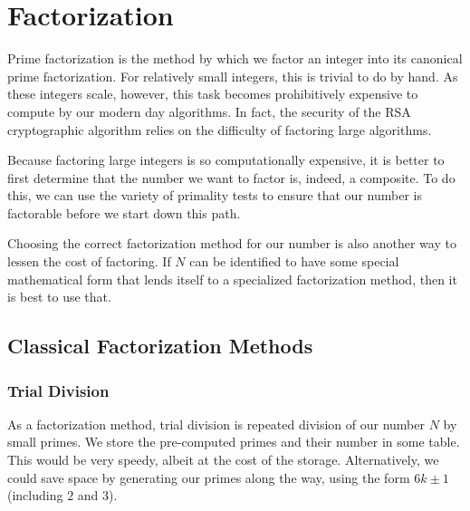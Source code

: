 \documentclass{article}
\begin{document}


\section{Factorization}\label{Factorization}

\par Prime factorization is the method by which we factor an integer into its canonical prime factorization.
For relatively small integers, this is trivial to do by hand. As these integers scale, however, this task
becomes prohibitively expensive to compute by our modern day algorithms. In fact, the security of the RSA
cryptographic algorithm relies on the difficulty of factoring large algorithms.

\par Because factoring large integers is so computationally expensive, it is better to first determine that
the number we want to factor is, indeed, a composite. To do this, we can use the variety of primality tests
to ensure that our number is factorable before we start down this path.

\par Choosing the correct factorization method for our number is also another way to lessen the cost of
factoring. If $N$ can be identified to have some special mathematical form that lends itself to a specialized
factorization method, then it is best to use that.


\subsection*{Classical Factorization Methods}

\subsubsection*{ Trial Division }
\par As a factorization method, trial division is repeated division of our number $N$ by
small primes. We store the pre-computed primes and their number in some table. This would be very
speedy, albeit at the cost of the storage. Alternatively, we could save space by generating our
primes along the way, using the form $6k \pm 1$ (including $2$ and $3$).
\end{document}
